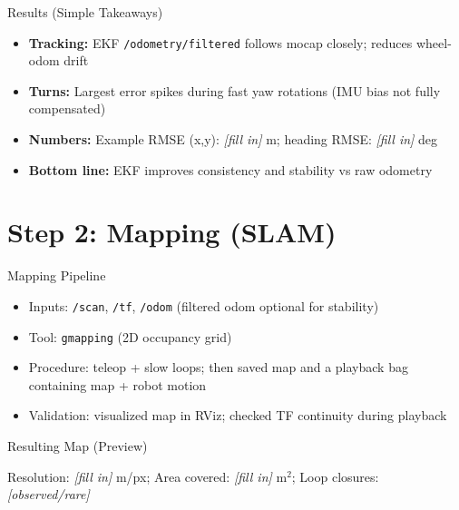 \documentclass[10pt]{beamer}
\begin{document}
\begin{frame}{Results (Simple Takeaways)}
\begin{itemize}
    \item \textbf{Tracking:} EKF \texttt{/odometry/filtered} follows mocap closely; reduces wheel-odom drift
    \item \textbf{Turns:} Largest error spikes during fast yaw rotations (IMU bias not fully compensated)
    \item \textbf{Numbers:} Example RMSE (x,y): \textit{[fill in]} m; heading RMSE: \textit{[fill in]} deg
    \item \textbf{Bottom line:} EKF improves consistency and stability vs raw odometry
\end{itemize}
\end{frame}

\begin{frame}{Trajectories vs Ground Truth}
\begin{center}

\vspace{2mm}
{\scriptsize Fixed Frame: \texttt{odom}; Data source: recorded rosbag from the TurtleBot3}}
\end{center}
\end{frame}

\section{Step 2: Mapping (SLAM)}

\begin{frame}{Mapping Pipeline}
\begin{itemize}
    \item Inputs: \texttt{/scan}, \texttt{/tf}, \texttt{/odom} (filtered odom optional for stability)
    \item Tool: \texttt{gmapping} (2D occupancy grid)
    \item Procedure: teleop + slow loops; then saved map and a playback bag containing map + robot motion
    \item Validation: visualized map in RViz; checked TF continuity during playback
\end{itemize}
\end{frame}

\begin{frame}{Resulting Map (Preview)}
\begin{center}

\vspace{2mm}
{\scriptsize Resolution: \textit{[fill in]} m/px; Area covered: \textit{[fill in]} m$^2$; Loop closures: \textit{[observed/rare]}}
\end{center}
\end{frame}
\end{document}
